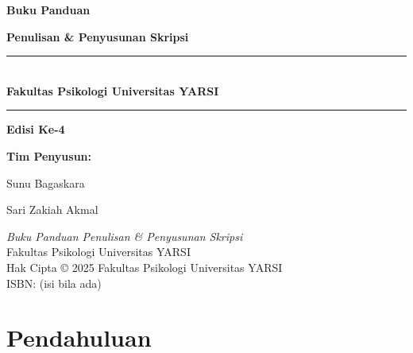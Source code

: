\documentclass[
  indonesian,
  letterpaper,
  DIV=11,
  numbers=noendperiod]{scrreprt}
\author{}
\date{}
\renewcommand*\contentsname{Daftar Isi}
\newcommand\contentsname{Daftar Isi}
\begin{document}


\cleardoublepage

\begin{titlepage}
\centering
\vspace*{2.5cm}
{\fontsize{22pt}{26pt}\selectfont\bfseries Buku Panduan\\[2mm]}
{\fontsize{22pt}{26pt}\selectfont\bfseries Penulisan \& Penyusunan Skripsi\par}

\vspace{1.2cm}
\rule{\linewidth}{0.5pt}\\[-6pt]
{\large \textbf{Fakultas Psikologi Universitas YARSI}}\par
\rule{\linewidth}{0.5pt}

\vspace{1.4cm}
{\large \textbf{Edisi Ke-4}\par}

\vfill
{\large \textbf{Tim Penyusun:}}\par
{\large Sunu Bagaskara\par}
{\large Sari Zakiah Akmal\par}
\vspace*{1.2cm}
\end{titlepage}
\cleardoublepage

\thispagestyle{empty}
\vspace*{\fill}
\begin{center}
\textit{Buku Panduan Penulisan \& Penyusunan Skripsi}\\
Fakultas Psikologi Universitas YARSI\\[6pt]
Hak Cipta © 2025 Fakultas Psikologi Universitas YARSI\\
ISBN: (isi bila ada)
\end{center}
\vspace*{\fill}
\clearpage

\renewcommand*\contentsname{Daftar Isi}
{
\hypersetup{linkcolor=}
\setcounter{tocdepth}{2}
\tableofcontents
}


\chapter*{\texorpdfstring{\textbf{Pendahuluan}}{Pendahuluan}}\label{pendahuluan}
\end{document}
